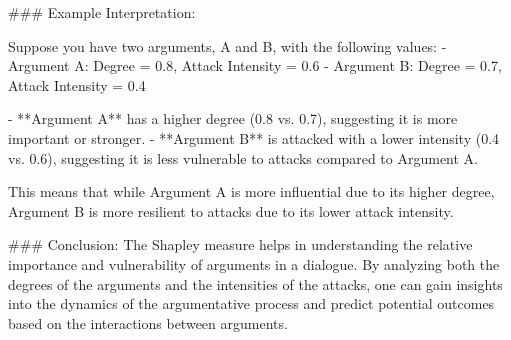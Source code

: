 ### Example Interpretation:

Suppose you have two arguments, A and B, with the following values:
- Argument A: Degree = 0.8, Attack Intensity = 0.6
- Argument B: Degree = 0.7, Attack Intensity = 0.4

- **Argument A** has a higher degree (0.8 vs. 0.7), suggesting it is more important or stronger.
- **Argument B** is attacked with a lower intensity (0.4 vs. 0.6), suggesting it is less vulnerable to attacks compared to Argument A.

This means that while Argument A is more influential due to its higher degree, Argument B is more resilient to attacks due to its lower attack intensity.

### Conclusion:
The Shapley measure helps in understanding the relative importance and vulnerability of arguments in a dialogue. By analyzing both the degrees of the arguments and the intensities of the attacks, one can gain insights into the dynamics of the argumentative process and predict potential outcomes based on the interactions between arguments.
